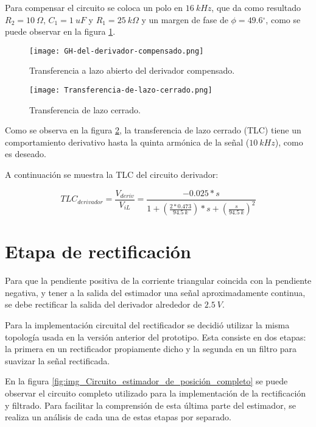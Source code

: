 Para compensar el circuito se coloca un polo en $16 \:kHz$, que da como resultado $R_2=10\:\Omega$, $C_1=1\:uF$ y $R_1=25\: k\Omega$ y un margen de fase de $\phi =49.6{}^\circ $, como se puede observar en la figura \ref{fig:img_GH del derivador compensado}.

\begin{figure}[H]
	\centering
	\texttt{[image: GH-del-derivador-compensado.png]}
	\caption{Transferencia a lazo abierto del derivador compensado.}
	\label{fig:img_GH del derivador compensado}
\end{figure}

\begin{figure}[H]
	\centering
	\texttt{[image: Transferencia-de-lazo-cerrado.png]}
	\caption{Transferencia de lazo cerrado.}
	\label{fig:img_Transferencia-de-lazo-cerrado}
\end{figure}

Como se observa en la figura \ref{fig:img_Transferencia-de-lazo-cerrado}, la transferencia de lazo cerrado (TLC) tiene un comportamiento derivativo hasta la quinta armónica de la señal ($10 \:kHz$), como es deseado.

A continuación se muestra la TLC del circuito derivador:

\begin{equation} \label{eq_TLC_derivador}
	{TLC}_{derivador}=\frac{V_{deriv}}{V_{iL}}=\frac{-0.025*s}{1+(\frac{2*0.473}{94.5\: k})*s+(\frac{s}{94.5\:k})^2}
\end{equation} 

\section{Etapa de rectificación}

Para que la pendiente positiva de la corriente triangular coincida con la pendiente negativa, y tener a la salida del estimador una señal aproximadamente continua, se debe rectificar la salida del derivador alrededor de $2.5\:V$.

Para la implementación circuital del rectificador se decidió utilizar la misma topología usada en la versión anterior del prototipo. Esta consiste en dos etapas: la primera en un rectificador propiamente dicho y la segunda en un filtro para suavizar la señal rectificada.

En la figura \ref{fig:img_Circuito_estimador_de_posición_completo} se puede observar el circuito completo utilizado para la implementación de la rectificación y filtrado. Para facilitar la comprensión de esta última parte del estimador, se realiza un análisis de cada una de estas etapas por separado.

